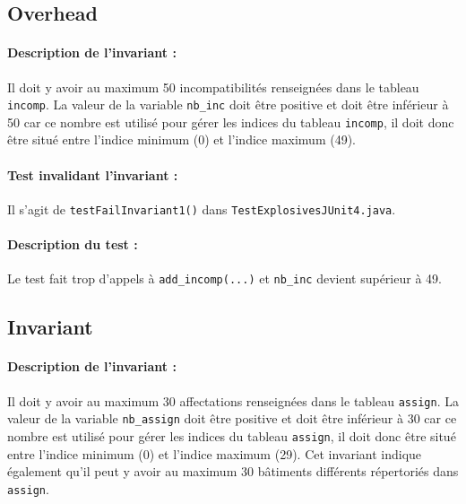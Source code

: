 \documentclass{article}
\begin{document}
\subsection{Overhead}

\newpage

\paragraph{Description de l'invariant :} Il doit y avoir au maximum 50 incompatibilités renseignées dans le tableau \texttt{incomp}. La valeur de la variable \texttt{nb\_inc} doit être positive et doit être inférieur à 50 car ce nombre est utilisé pour gérer les indices du tableau \texttt{incomp}, il doit donc être situé entre l'indice minimum (0) et l'indice maximum (49).

\vspace{-0.2cm}
\paragraph{Test invalidant l'invariant :} Il s'agit de \texttt{testFailInvariant1()} dans \texttt{TestExplosivesJUnit4.java}.

\vspace{-0.2cm}
\paragraph{Description du test :} Le test fait trop d'appels à \texttt{add\_incomp(...)} et \texttt{nb\_inc} devient supérieur à 49.  

\subsection{Invariant }

\paragraph{Description de l'invariant :} Il doit y avoir au maximum 30 affectations renseignées dans le tableau \texttt{assign}. La valeur de la variable \texttt{nb\_assign} doit être positive et doit être inférieur à 30 car ce nombre est utilisé pour gérer les indices du tableau \texttt{assign}, il doit donc être situé entre l'indice minimum (0) et l'indice maximum (29). Cet invariant indique également qu'il peut y avoir au maximum 30 bâtiments différents répertoriés dans \texttt{assign}.

\vspace{-0.2cm}
\end{document}
